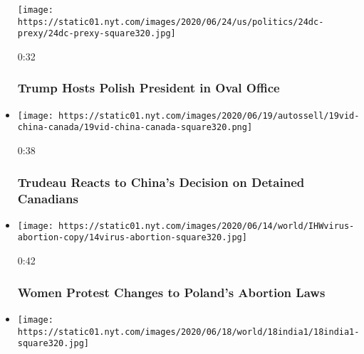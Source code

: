 \begin{itemize}
  \texttt{[image: https://static01.nyt.com/images/2020/06/24/us/politics/24dc-prexy/24dc-prexy-square320.jpg]}

  0:32

  \hypertarget{trump-hosts-polish-president-in-oval-office}{%
  \subsubsection{Trump Hosts Polish President in Oval
  Office}\label{trump-hosts-polish-president-in-oval-office}}
\item
  \href{https://www.nytimes.com/video/us/100000007200829/trudeau-china-indictment.html?action=click\&module=video-series-bar\&region=header\&pgtype=Article\&playlistId=video/world}{}

  \texttt{[image: https://static01.nyt.com/images/2020/06/19/autossell/19vid-china-canada/19vid-china-canada-square320.png]}

  0:38

  \hypertarget{trudeau-reacts-to-chinas-decision-on-detained-canadians}{%
  \subsubsection{Trudeau Reacts to China's Decision on Detained
  Canadians}\label{trudeau-reacts-to-chinas-decision-on-detained-canadians}}
\item
  \href{https://www.nytimes.com/video/us/100000007199389/women-protest-changes-to-polands-abortion-laws.html?action=click\&module=video-series-bar\&region=header\&pgtype=Article\&playlistId=video/world}{}

  \texttt{[image: https://static01.nyt.com/images/2020/06/14/world/IHWvirus-abortion-copy/14virus-abortion-square320.jpg]}

  0:42

  \hypertarget{women-protest-changes-to-polands-abortion-laws}{%
  \subsubsection{Women Protest Changes to Poland's Abortion
  Laws}\label{women-protest-changes-to-polands-abortion-laws}}
\item
  \href{https://www.nytimes.com/video/world/asia/100000007197958/anti-china-protests-india.html?action=click\&module=video-series-bar\&region=header\&pgtype=Article\&playlistId=video/world}{}

  \texttt{[image: https://static01.nyt.com/images/2020/06/18/world/18india1/18india1-square320.jpg]}


\end{itemize}
